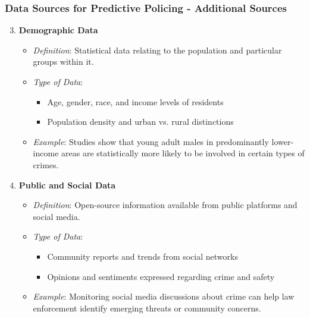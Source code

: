 \documentclass[aspectratio=169]{beamer}
\begin{document}
\begin{frame}[fragile]
    \frametitle{Data Sources for Predictive Policing - Additional Sources}
    \begin{enumerate}
        \setcounter{enumi}{2}
        \item \textbf{Demographic Data}
        \begin{itemize}
            \item \textit{Definition}: Statistical data relating to the population and particular groups within it.
            \item \textit{Type of Data}:
            \begin{itemize}
                \item Age, gender, race, and income levels of residents
                \item Population density and urban vs. rural distinctions
            \end{itemize}
            \item \textit{Example}: Studies show that young adult males in predominantly lower-income areas are statistically more likely to be involved in certain types of crimes.
        \end{itemize}

        \item \textbf{Public and Social Data}
        \begin{itemize}
            \item \textit{Definition}: Open-source information available from public platforms and social media.
            \item \textit{Type of Data}:
            \begin{itemize}
                \item Community reports and trends from social networks
                \item Opinions and sentiments expressed regarding crime and safety
            \end{itemize}
            \item \textit{Example}: Monitoring social media discussions about crime can help law enforcement identify emerging threats or community concerns.
        \end{itemize}


\end{enumerate}
\end{frame}
\end{document}

